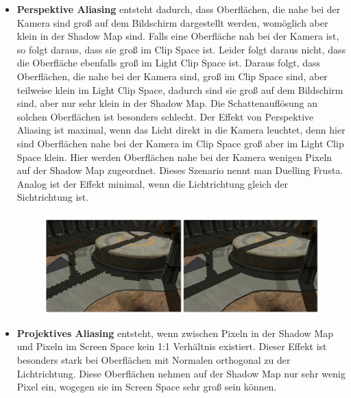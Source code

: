 \begin{itemize}
  \item \textbf{Perspektive Aliasing} entsteht dadurch, dass Oberflächen, die nahe bei der Kamera sind groß auf dem 
    Bildschirm dargestellt werden, womöglich aber klein in der Shadow Map sind.
    Falls eine Oberfläche nah bei der Kamera ist, so folgt daraus, dass sie groß im Clip Space ist.
    Leider folgt daraus nicht, dass die Oberfläche ebenfalls groß im Light Clip Space ist.
    Daraus folgt, dass 
    Oberflächen, die nahe bei der Kamera sind, groß im Clip Space sind, aber teilweise klein im Light Clip Space,
    dadurch sind sie groß auf dem Bildschirm sind, aber nur sehr klein in der Shadow Map. 
    Die Schattenauflösung an solchen Oberflächen ist besonders schlecht.
    Der Effekt von Perspektive Aliasing ist maximal, wenn das Licht direkt in die Kamera leuchtet, denn hier 
    sind Oberflächen nahe bei der Kamera im Clip Space groß aber im Light Clip Space klein.
    Hier werden Oberflächen nahe bei der Kamera wenigen Pixeln auf der Shadow Map zugeordnet. 
    Dieses Szenario nennt man Duelling Frusta. 
    Analog ist der Effekt minimal, wenn die Lichtrichtung gleich der Sichtrichtung ist.
    \begin{figure}[H]
      \begin{center}
        \includegraphics[width=1\textwidth]{res/img/perspective-aliasing1/image.jpg}
        \caption{}
        \label{fig:perspective-aliasing}
      \end{center}
    \end{figure}
  \item \textbf{Projektives Aliasing} entsteht, wenn zwischen Pixeln in der Shadow Map und Pixeln 
    im Screen Space kein 1:1 Verhältnis existiert. Dieser Effekt ist besonders stark bei Oberflächen
    mit Normalen orthogonal zu der Lichtrichtung. Diese Oberflächen nehmen auf der Shadow Map nur sehr wenig 
    Pixel ein, wogegen sie im Screen Space sehr groß sein können. 
    \begin{figure}[H]
      \begin{center}

\end{center}
\end{figure}
\end{itemize}
